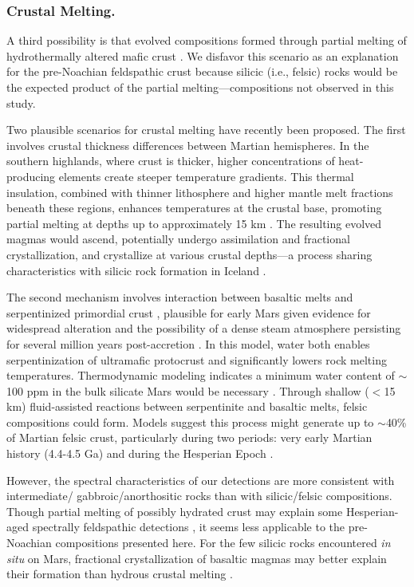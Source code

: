 \documentclass[12pt]{article}
\begin{document}
\subsubsection*{Crustal Melting.} 

A third possibility is that evolved compositions formed through partial melting of hydrothermally altered mafic crust \citep{BonnetGibet2025, Bernadet2025}. We disfavor this scenario as an explanation for the pre-Noachian feldspathic crust because silicic (i.e., felsic) rocks would be the expected product of the partial melting---compositions not observed in this study.

Two plausible scenarios for crustal melting have recently been proposed. The first involves crustal thickness differences between Martian hemispheres. In the southern highlands, where crust is thicker, higher concentrations of heat-producing elements create steeper temperature gradients. This thermal insulation, combined with thinner lithosphere and higher mantle melt fractions beneath these regions, enhances temperatures at the crustal base, promoting partial melting at depths up to approximately 15 km \citep{BonnetGibet2022, BonnetGibet2025}. The resulting evolved magmas would ascend, potentially undergo assimilation and fractional crystallization, and crystallize at various crustal depths---a process sharing characteristics with silicic rock formation in Iceland \citep{Jonasson2007, Martin2007, Martin2010}.

The second mechanism involves interaction between basaltic melts and serpentinized primordial crust \citep{Bernadet2025}, plausible for early Mars given evidence for widespread alteration \citep{Bibring2006, Bishop2008, Ehlmann2009, Ehlmann2014, Wordsworth2017, Viviano2023, Carter2023, Royer2024} and the possibility of a dense steam atmosphere persisting for several million years post-accretion \citep{Abe2011, Scherf2020}. In this model, water both enables serpentinization of ultramafic protocrust and significantly lowers rock melting temperatures. Thermodynamic modeling indicates a minimum water content of $\sim$100 ppm in the bulk silicate Mars would be necessary \citep{Bernadet2025}. Through shallow ($<$15 km) fluid-assisted reactions between serpentinite and basaltic melts, felsic compositions could form. Models suggest this process might generate up to $\sim$40\% of Martian felsic crust, particularly during two periods: very early Martian history (4.4-4.5 Ga) and during the Hesperian Epoch \citep{Bernadet2025}.

However, the spectral characteristics of our detections are more consistent with intermediate/ gabbroic/anorthositic rocks than with silicic/felsic compositions. Though partial melting of possibly hydrated crust may explain some Hesperian-aged spectrally feldspathic detections \citep{Farrand2021, Rogers2022, Michalski2023}, it seems less applicable to the pre-Noachian compositions presented here. For the few silicic rocks encountered \textit{in situ} on Mars, fractional crystallization of basaltic magmas may better explain their formation than hydrous crustal melting \citep{Christensen2005, Udry2018,Ostwald2022}.
\end{document}
